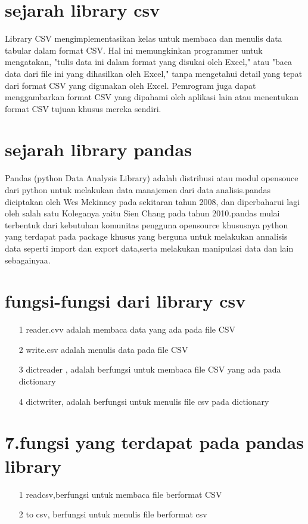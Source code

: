 \section{sejarah library csv}
\hspace*{1cm}Library CSV mengimplementasikan kelas untuk membaca dan menulis data tabular dalam format CSV. Hal ini memungkinkan programmer untuk mengatakan, "tulis data ini dalam format yang disukai oleh Excel," atau "baca data dari file ini yang dihasilkan oleh Excel," tanpa mengetahui detail yang tepat dari format CSV yang digunakan oleh Excel. Pemrogram juga dapat menggambarkan format CSV yang dipahami oleh aplikasi lain atau menentukan format CSV tujuan khusus mereka sendiri.
\section{sejarah library pandas}
\hspace*{1cm}	Pandas (python Data Analysis Library) adalah distribusi atau modul opensouce  dari python untuk melakukan data manajemen dari data analisis.pandas diciptakan oleh  Wes Mckinney pada sekitaran tahun 2008, dan diperbaharui lagi oleh salah satu Koleganya yaitu Sien Chang pada tahun 2010.pandas mulai terbentuk dari  kebutuhan komunitas pengguna opensource khususnya python  yang terdapat pada package khusus yang berguna untuk melakukan  annalisis data seperti import dan export data,serta melakukan manipulasi data dan lain sebagainyaa. 
\newpage
\section{fungsi-fungsi dari library csv}
\begin{enumerate}
    \item [1]  reader.cvv adalah membaca data yang ada pada file CSV
\item[2] write.csv adalah  menulis data pada file CSV
\item[3] dictreader , adalah berfungsi untuk membaca file CSV yang ada pada dictionary
\item[4] dictwriter, adalah  berfungsi untuk menulis file csv pada  dictionary
\end{enumerate}
\section{7.fungsi yang terdapat pada pandas library}
\begin{enumerate}
    \item[1] readcsv,berfungsi untuk membaca file berformat CSV
\item[2] to csv, berfungsi untuk menulis file berformat csv
\end{enumerate}
